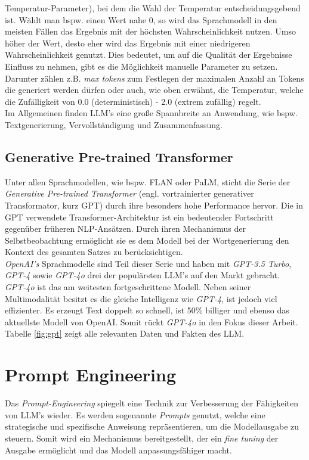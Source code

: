 Temperatur-Parameter), bei dem die Wahl der Temperatur entscheidungsgebend ist. Wählt man bspw. einen Wert nahe 0, so wird das Sprachmodell in den meisten Fällen das Ergebnis mit der höchsten Wahrscheinlichkeit nutzen. Umso höher der Wert, desto eher wird das Ergebnis mit einer niedrigeren Wahrscheinlichkeit genutzt. \cite*{WeightsBiases} Dies bedeutet, um auf die Qualität der Ergebnisse Einfluss zu nehmen, gibt es die Möglichkeit manuelle Parameter zu setzen. Darunter zählen z.B. \textit{max tokens} zum Festlegen der maximalen Anzahl an Tokens die generiert werden dürfen oder auch, wie oben erwähnt, die Temperatur, welche die Zufälligkeit von 0.0 (deterministisch) - 2.0 (extrem zufällig) regelt.\\ Im Allgemeinen finden LLM's eine große Spannbreite an Anwendung, wie bspw. Textgenerierung, Vervollständigung und Zusammenfassung. \cite*{dhadukHowLargeLanguage2023}

\subsection{Generative Pre-trained Transformer}\label{subsection:gpt}
Unter allen Sprachmodellen, wie bspw. FLAN oder PaLM, sticht die Serie der \textit{Generative Pre-trained Transformer} (engl. vortrainierter generativer Transformator, kurz GPT) durch ihre besonders hohe Performance hervor. \cite*{yeComprehensiveCapabilityAnalysis2023} Die in GPT verwendete Transformer-Architektur ist ein bedeutender Fortschritt gegenüber früheren \acs{NLP}-Ansätzen. Durch ihren Mechanismus der Selbstbeobachtung ermöglicht sie es dem Modell bei der Wortgenerierung den Kontext des gesamten Satzes zu berücksichtigen. \cite*{yenduriGenerativePretrainedTransformer2023} \\ \textit{OpenAI's} Sprachmodelle sind Teil dieser Serie und haben mit \textit{GPT-3.5 Turbo}, \textit{GPT-4} sowie \textit{GPT-4o} drei der populärsten LLM's auf den Markt gebracht. \cite*{yaoSurveyLargeLanguage2024}\\
\textit{GPT-4o} ist das am weitesten fortgeschrittene Modell. Neben seiner Multimodalität besitzt es die gleiche Intelligenz wie \textit{GPT-4}, ist jedoch viel effizienter. Es erzeugt Text doppelt so schnell, ist 50\% billiger und ebenso das aktuellste Modell von OpenAI. Somit rückt \textit{GPT-4o} in den Fokus dieser Arbeit. \cite*{OpenAIPlatform} Tabelle \ref{fig:gpt} zeigt alle relevanten Daten und Fakten des LLM.



\section{Prompt Engineering}
Das \textit{Prompt-Engineering} spiegelt eine Technik zur Verbesserung der Fähigkeiten von LLM's wieder. Es werden sogenannte \textit{Prompts} genutzt, welche eine strategische und spezifische Anweisung repräsentieren, um die Modellausgabe zu steuern. Somit wird ein Mechanismus bereitgestellt, der ein \textit{fine tuning} der Ausgabe ermöglicht und das Modell anpassungsfähiger macht. \cite*{sahooSystematicSurveyPrompt2024} 

